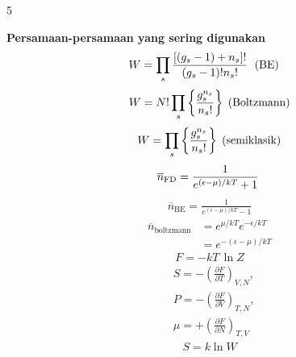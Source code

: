 \documentclass[a4paper  , 6 pt]{article}
\begin{document}
\begin{tiny}
\begin{multicols} {5}

\setlength \belowdisplayskip{0 pt} 
\setlength \abovedisplayskip{0 pt}
\textbf{Persamaan-persamaan yang sering digunakan } 
\begin{align}
W 
& = \prod_s \frac{[(g_s - 1) + n_s] !}{(g_s - 1)! n_s ! } \hspace{0.1 cm } \text{  (BE)}
\end{align} 
\begin{align}
W = N! \prod_s \left \lbrace \frac{g_s^{n_s}}{n_s !}\right \rbrace \hspace{0.1 cm }\text{(Boltzmann)}
\end{align}
\begin{align}
W =  \prod_s \left \lbrace \frac{g_s^{n_s}}{n_s !}\right \rbrace \hspace{0.1 cm} \text{(semiklasik)} 
\end{align}
\begin{align}
\overline{n}_\mathrm{FD} =  \frac{1}{e^{(\epsilon - \mu )/kT} +1} \hspace{0.1 cm}  
\end{align}
\begin{align}
\overline{n}_\mathrm{BE} =  \frac{1}{e^{(\epsilon - \mu )/kT} - 1} 
\end{align}
\begin{align}
\overline{n}_\mathrm{boltzmann} &= e^{\mu/ kT} e^{- \epsilon / kT} \nonumber \\
& = e^{- (\epsilon - \mu )/ kT} 
\end{align}           
\begin{align}
F = - kT \, \ln Z 
\end{align}
\begin{align}
& S = -\left(\frac{\partial F}{\partial T}\right)_{V,N}, \\
& P  = - \left(\frac{\partial F}{\partial V}\right)_{T,N}, \\
 & \mu = + \left(\frac{\partial F}{\partial N}\right)_{T,V}
\end{align}
\begin{align}
S = k \ln W
\end{align}
\begin{align}

\end{align}
\end{multicols}
\end{tiny}
\end{document}
